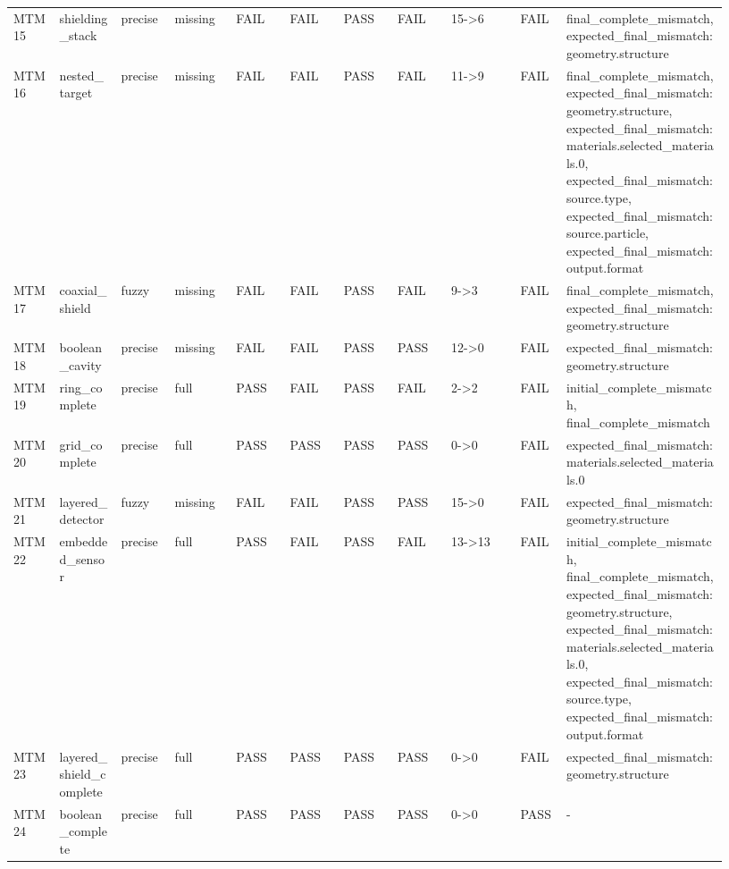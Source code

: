 \documentclass[11pt]{ctexart}
\begin{document}
\begin{longtable}{p{0.06\linewidth}p{0.08\linewidth}p{0.07\linewidth}p{0.08\linewidth}p{0.07\linewidth}p{0.07\linewidth}p{0.07\linewidth}p{0.07\linewidth}p{0.09\linewidth}p{0.06\linewidth}p{0.21\linewidth}}
MTM15 & shielding\_stack & precise & missing & FAIL & FAIL & PASS & FAIL & 15->6 & FAIL & final\_complete\_mismatch, expected\_final\_mismatch:geometry.structure \\
MTM16 & nested\_target & precise & missing & FAIL & FAIL & PASS & FAIL & 11->9 & FAIL & final\_complete\_mismatch, expected\_final\_mismatch:geometry.structure, expected\_final\_mismatch:materials.selected\_materials.0, expected\_final\_mismatch:source.type, expected\_final\_mismatch:source.particle, expected\_final\_mismatch:output.format \\
MTM17 & coaxial\_shield & fuzzy & missing & FAIL & FAIL & PASS & FAIL & 9->3 & FAIL & final\_complete\_mismatch, expected\_final\_mismatch:geometry.structure \\
MTM18 & boolean\_cavity & precise & missing & FAIL & FAIL & PASS & PASS & 12->0 & FAIL & expected\_final\_mismatch:geometry.structure \\
MTM19 & ring\_complete & precise & full & PASS & FAIL & PASS & FAIL & 2->2 & FAIL & initial\_complete\_mismatch, final\_complete\_mismatch \\
MTM20 & grid\_complete & precise & full & PASS & PASS & PASS & PASS & 0->0 & FAIL & expected\_final\_mismatch:materials.selected\_materials.0 \\
MTM21 & layered\_detector & fuzzy & missing & FAIL & FAIL & PASS & PASS & 15->0 & FAIL & expected\_final\_mismatch:geometry.structure \\
MTM22 & embedded\_sensor & precise & full & PASS & FAIL & PASS & FAIL & 13->13 & FAIL & initial\_complete\_mismatch, final\_complete\_mismatch, expected\_final\_mismatch:geometry.structure, expected\_final\_mismatch:materials.selected\_materials.0, expected\_final\_mismatch:source.type, expected\_final\_mismatch:output.format \\
MTM23 & layered\_shield\_complete & precise & full & PASS & PASS & PASS & PASS & 0->0 & FAIL & expected\_final\_mismatch:geometry.structure \\
MTM24 & boolean\_complete & precise & full & PASS & PASS & PASS & PASS & 0->0 & PASS & - \\
\bottomrule
\end{longtable}
\end{document}
